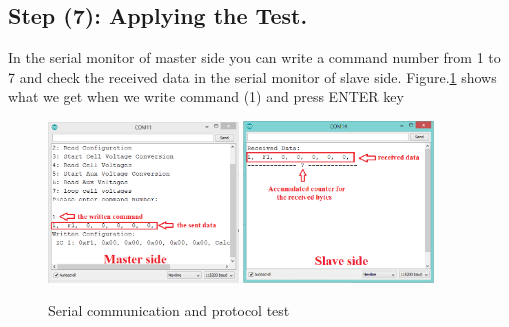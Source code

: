 \subsection{Step (7): Applying the Test.}
In the serial monitor of master side you can write a command number from 1 to 7 and check the received data in the serial monitor of slave side. Figure.\ref{fig:serialTest} shows what we get when we write command (1) and press ENTER key
\begin{figure}[h]
    \centering
    \includegraphics[width=0.45\textwidth]{figures/image17}\;
    \includegraphics[width=0.45\textwidth]{figures/image18}
    \caption{Serial communication and protocol test}
        \label{fig:serialTest}
\end{figure}